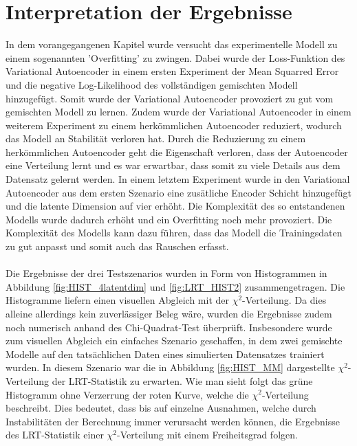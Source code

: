 \documentclass[%
thesis=student,%
coverpage=false,%
titlepage=false,%
headmarks=true, %
german,%
font=libertine, %
math=newpxtx, %
BCOR=5mm,%
coverBCOR=11mm%
]{tumbook}
\theoremstyle{break}
\begin{document}
\section{Interpretation der Ergebnisse}
In dem vorangegangenen Kapitel wurde versucht das experimentelle Modell zu einem sogenannten 'Overfitting' zu zwingen. Dabei wurde der Loss-Funktion des Variational Autoencoder in einem ersten Experiment der Mean Squarred Error und die negative Log-Likelihood des vollständigen gemischten Modell hinzugefügt. Somit wurde der Variational Autoencoder provoziert zu gut vom gemischten Modell zu lernen. Zudem wurde der Variational Autoencoder in einem weiterem Experiment zu einem herkömmlichen Autoencoder reduziert, wodurch das Modell an Stabilität verloren hat. Durch die Reduzierung zu einem herkömmlichen Autoencoder geht die Eigenschaft verloren, dass der Autoencoder eine Verteilung lernt und es war erwartbar, dass somit zu viele Details aus dem Datensatz gelernt werden. In einem letztem Experiment wurde in den Variational Autoencoder aus dem ersten Szenario eine zusätliche Encoder Schicht hinzugefügt und die latente Dimension auf vier erhöht. Die Komplexität des so entstandenen Modells wurde dadurch erhöht und ein Overfitting noch mehr provoziert. Die Komplexität des Modells kann dazu führen, dass das Modell die Trainingsdaten zu gut anpasst und somit auch das Rauschen erfasst.\\
\\
Die Ergebnisse der drei Testszenarios wurden in Form von Histogrammen in Abbildung \ref{fig:HIST_4latentdim} und \ref{fig:LRT_HIST2} zusammengetragen. Die Histogramme liefern einen visuellen Abgleich mit der $\chi^2$-Verteilung. Da dies alleine allerdings kein zuverlässiger Beleg wäre, wurden die Ergebnisse zudem noch numerisch anhand des Chi-Quadrat-Test überprüft. Insbesondere wurde zum visuellen Abgleich ein einfaches Szenario geschaffen, in dem zwei gemischte Modelle auf den tatsächlichen Daten eines simulierten Datensatzes trainiert wurden. In diesem Szenario war die in Abbildung \ref{fig:HIST_MM} dargestellte $\chi^2$-Verteilung der LRT-Statistik zu erwarten. Wie man sieht folgt das grüne Histogramm ohne Verzerrung der roten Kurve, welche die $\chi^2$-Verteilung beschreibt. Dies bedeutet, dass bis auf einzelne Ausnahmen, welche durch Instabilitäten der Berechnung immer verursacht werden können, die Ergebnisse des LRT-Statistik einer $\chi^2$-Verteilung mit einem Freiheitsgrad folgen.\\
\\
\end{document}

